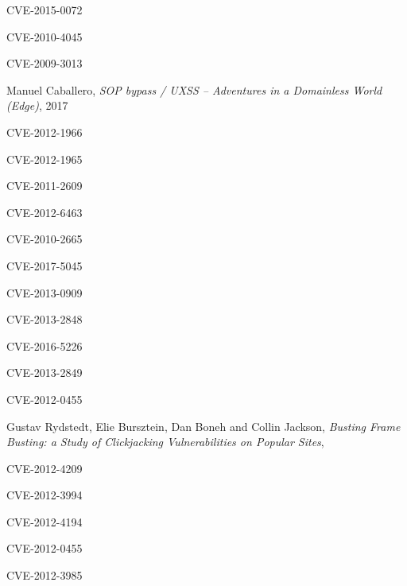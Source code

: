 \documentclass[journal]{IEEEtran}
\begin{document}
\begin{thebibliography}{1}
CVE-2015-0072

CVE-2010-4045

CVE-2009-3013

Manuel Caballero,
\textit{SOP bypass / UXSS – Adventures in a Domainless World (Edge)},
2017

CVE-2012-1966

CVE-2012-1965

CVE-2011-2609

CVE-2012-6463

CVE-2010-2665

CVE-2017-5045

CVE-2013-0909

CVE-2013-2848

CVE-2016-5226

CVE-2013-2849

CVE-2012-0455

Gustav Rydstedt, Elie Bursztein, Dan Boneh and Collin Jackson,
\textit{Busting Frame Busting:
a Study of Clickjacking Vulnerabilities on Popular Sites},

CVE-2012-4209

CVE-2012-3994

CVE-2012-4194

CVE-2012-0455

CVE-2012-3985

\end{thebibliography}

\ifCLASSOPTIONcaptionsoff
  \newpage
\fi





%
%
%
\end{document}
